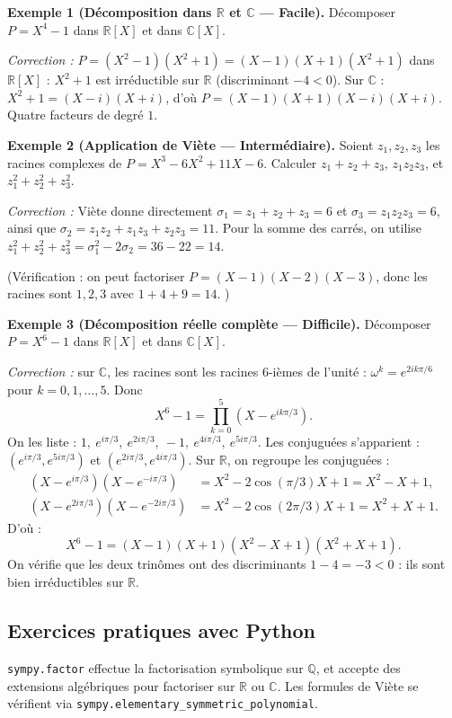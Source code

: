 \documentclass[12pt,a4paper]{report}
\theoremstyle{definition}
\theoremstyle{remark}
\begin{document}
\textbf{Exemple 1 (Décomposition dans $\mathbb{R}$ et $\mathbb{C}$ --- Facile).}
Décomposer $P = X^4 - 1$ dans $\mathbb{R}[X]$ et dans $\mathbb{C}[X]$.

\textit{Correction :}
$P = (X^2 - 1)(X^2 + 1) = (X - 1)(X + 1)(X^2 + 1)$ dans $\mathbb{R}[X]$ : $X^2 + 1$ est irréductible sur $\mathbb{R}$ (discriminant $-4 < 0$).
Sur $\mathbb{C}$ : $X^2 + 1 = (X - i)(X + i)$, d'où $P = (X - 1)(X + 1)(X - i)(X + i)$. Quatre facteurs de degré $1$.

\medskip

\textbf{Exemple 2 (Application de Viète --- Intermédiaire).}
Soient $z_1, z_2, z_3$ les racines complexes de $P = X^3 - 6X^2 + 11X - 6$. Calculer $z_1 + z_2 + z_3$, $z_1 z_2 z_3$, et $z_1^2 + z_2^2 + z_3^2$.

\textit{Correction :} Viète donne directement $\sigma_1 = z_1 + z_2 + z_3 = 6$ et $\sigma_3 = z_1 z_2 z_3 = 6$, ainsi que $\sigma_2 = z_1 z_2 + z_1 z_3 + z_2 z_3 = 11$.
Pour la somme des carrés, on utilise $z_1^2 + z_2^2 + z_3^2 = \sigma_1^2 - 2 \sigma_2 = 36 - 22 = 14$.

(Vérification : on peut factoriser $P = (X-1)(X-2)(X-3)$, donc les racines sont $1, 2, 3$ avec $1 + 4 + 9 = 14$. \checkmark)

\medskip

\textbf{Exemple 3 (Décomposition réelle complète --- Difficile).}
Décomposer $P = X^6 - 1$ dans $\mathbb{R}[X]$ et dans $\mathbb{C}[X]$.

\textit{Correction :} sur $\mathbb{C}$, les racines sont les racines $6$-ièmes de l'unité : $\omega^k = e^{2 i k \pi / 6}$ pour $k = 0, 1, \dots, 5$. Donc
\[ X^6 - 1 = \prod_{k=0}^{5} (X - e^{i k \pi / 3}). \]
On les liste : $1,\ e^{i\pi/3},\ e^{2i\pi/3},\ -1,\ e^{4i\pi/3},\ e^{5i\pi/3}$. Les conjuguées s'apparient : $(e^{i\pi/3}, e^{5i\pi/3})$ et $(e^{2i\pi/3}, e^{4i\pi/3})$.
Sur $\mathbb{R}$, on regroupe les conjuguées :
\begin{align*}
(X - e^{i\pi/3})(X - e^{-i\pi/3}) &= X^2 - 2\cos(\pi/3) X + 1 = X^2 - X + 1, \\
(X - e^{2i\pi/3})(X - e^{-2i\pi/3}) &= X^2 - 2\cos(2\pi/3) X + 1 = X^2 + X + 1.
\end{align*}
D'où :
\[ X^6 - 1 = (X - 1)(X + 1)(X^2 - X + 1)(X^2 + X + 1). \]
On vérifie que les deux trinômes ont des discriminants $1 - 4 = -3 < 0$ : ils sont bien irréductibles sur $\mathbb{R}$.

\subsection{Exercices pratiques avec Python}
\texttt{sympy.factor} effectue la factorisation symbolique sur $\mathbb{Q}$, et accepte des extensions algébriques pour factoriser sur $\mathbb{R}$ ou $\mathbb{C}$. Les formules de Viète se vérifient via \texttt{sympy.elementary\_symmetric\_polynomial}.
\end{document}
